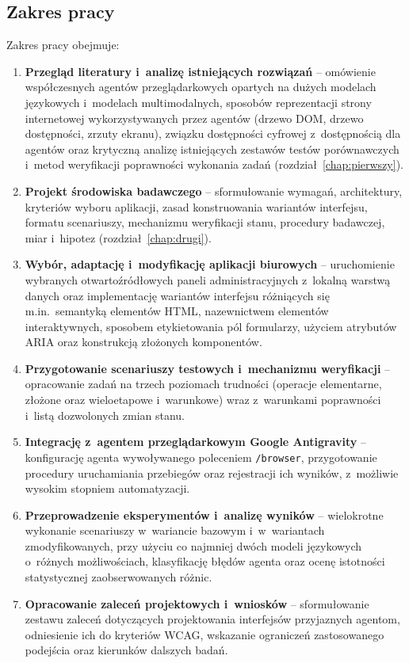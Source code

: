 \subsection*{Zakres pracy}
Zakres pracy obejmuje:
\begin{enumerate}
    \item \textbf{Przegląd literatury i~analizę istniejących rozwiązań} -- omówienie współczesnych agentów przeglądarkowych opartych na dużych modelach językowych i~modelach multimodalnych, sposobów reprezentacji strony internetowej wykorzystywanych przez agentów (drzewo DOM, drzewo dostępności, zrzuty ekranu), związku dostępności cyfrowej z~dostępnością dla agentów oraz krytyczną analizę istniejących zestawów testów porównawczych i~metod weryfikacji poprawności wykonania zadań (rozdział~\ref{chap:pierwszy}).
    \item \textbf{Projekt środowiska badawczego} -- sformułowanie wymagań, architektury, kryteriów wyboru aplikacji, zasad konstruowania wariantów interfejsu, formatu scenariuszy, mechanizmu weryfikacji stanu, procedury badawczej, miar i~hipotez (rozdział~\ref{chap:drugi}).
    \item \textbf{Wybór, adaptację i~modyfikację aplikacji biurowych} -- uruchomienie wybranych otwartoźródłowych paneli administracyjnych z~lokalną warstwą danych oraz implementację wariantów interfejsu różniących się m.in.~semantyką elementów HTML, nazewnictwem elementów interaktywnych, sposobem etykietowania pól formularzy, użyciem atrybutów ARIA oraz konstrukcją złożonych komponentów.
    \item \textbf{Przygotowanie scenariuszy testowych i~mechanizmu weryfikacji} -- opracowanie zadań na trzech poziomach trudności (operacje elementarne, złożone oraz wieloetapowe i~warunkowe) wraz z~warunkami poprawności i~listą dozwolonych zmian stanu.
    \item \textbf{Integrację z~agentem przeglądarkowym Google Antigravity} -- konfigurację agenta wywoływanego poleceniem \texttt{/browser}, przygotowanie procedury uruchamiania przebiegów oraz rejestracji ich wyników, z~możliwie wysokim stopniem automatyzacji.
    \item \textbf{Przeprowadzenie eksperymentów i~analizę wyników} -- wielokrotne wykonanie scenariuszy w~wariancie bazowym i~w~wariantach zmodyfikowanych, przy użyciu co najmniej dwóch modeli językowych o~różnych możliwościach, klasyfikację błędów agenta oraz ocenę istotności statystycznej zaobserwowanych różnic.
    \item \textbf{Opracowanie zaleceń projektowych i~wniosków} -- sformułowanie zestawu zaleceń dotyczących projektowania interfejsów przyjaznych agentom, odniesienie ich do kryteriów WCAG, wskazanie ograniczeń zastosowanego podejścia oraz kierunków dalszych badań.
\end{enumerate}

